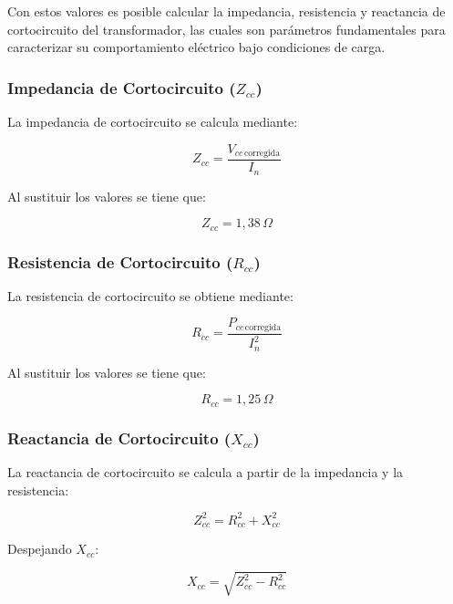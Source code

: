 Con estos valores es posible calcular la impedancia, resistencia y reactancia de cortocircuito del transformador, las cuales son parámetros fundamentales para caracterizar su comportamiento eléctrico bajo condiciones de carga.
\subsubsection*{Impedancia de Cortocircuito ($Z_{cc}$)}

La impedancia de cortocircuito se calcula mediante:

\begin{equation}
Z_{cc}=\frac{V_{cc\,\text{corregida}}}{I_n}
\tag{7.6}
\end{equation}

Al sustituir los valores se tiene que: 

\begin{equation}
Z_{cc}=1,38\,\Omega
\end{equation}

\subsubsection*{Resistencia de Cortocircuito ($R_{cc}$)}

La resistencia de cortocircuito se obtiene mediante:

\begin{equation}
R_{cc}=\frac{P_{cc\,\text{corregida}}}{I_n^2}
\tag{7.7}
\end{equation}

Al sustituir los valores se tiene que:

\begin{equation}
R_{cc}=1,25\,\Omega
\end{equation}

\subsubsection*{Reactancia de Cortocircuito ($X_{cc}$)}

La reactancia de cortocircuito se calcula a partir de la impedancia y la resistencia:

\begin{equation}
Z_{cc}^{2}=R_{cc}^{2}+X_{cc}^{2}
\tag{7.8}
\end{equation}

Despejando $X_{cc}$:

\begin{equation}
X_{cc}=\sqrt{Z_{cc}^{2}-R_{cc}^{2}}
\tag{7.9}
\end{equation}

